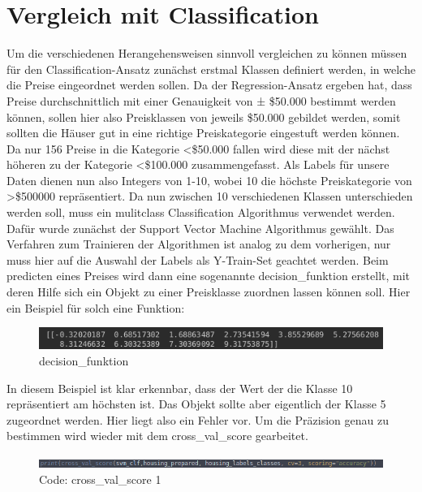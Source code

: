 \section{Vergleich mit Classification}
\label{vergleichMitClassification}
Um die verschiedenen Herangehensweisen sinnvoll vergleichen zu können müssen für den Classification-Ansatz zunächst erstmal Klassen definiert werden, in welche die Preise eingeordnet werden sollen. 
Da der Regression-Ansatz ergeben hat, dass Preise durchschnittlich mit einer Genauigkeit von ± \$50.000 bestimmt werden können, sollen hier also Preisklassen von jeweils \$50.000 gebildet werden, somit sollten die Häuser gut in eine richtige Preiskategorie eingestuft werden können. Da nur 156 Preise in die Kategorie <\$50.000 fallen wird diese mit der nächst höheren zu der Kategorie <\$100.000 zusammengefasst.
Als Labels für unsere Daten dienen nun also Integers von 1-10, wobei 10 die höchste Preiskategorie von >\$500000 repräsentiert.
Da nun zwischen 10 verschiedenen Klassen unterschieden werden soll, muss ein mulitclass Classification Algorithmus verwendet werden. Dafür wurde zunächst der Support Vector Machine Algorithmus gewählt. 
Das Verfahren zum Trainieren der Algorithmen ist analog zu dem vorherigen, nur muss hier auf die Auswahl der Labels als Y-Train-Set geachtet werden. 
Beim predicten eines Preises wird dann eine sogenannte decision\_funktion erstellt, mit deren Hilfe sich ein Objekt zu einer Preisklasse zuordnen lassen können soll.
Hier ein Beispiel für solch eine Funktion:
\newline
\begin{figure}
	\includegraphics[width=1.0\textwidth]{../Bilder/pasted image 0 (4).png}
	\caption{decision\_funktion}
\end{figure}
In diesem Beispiel ist klar erkennbar, dass der Wert der die Klasse 10 repräsentiert am höchsten ist. Das Objekt sollte aber eigentlich der Klasse 5 zugeordnet werden. 
Hier liegt also ein Fehler vor. Um die Präzision genau zu bestimmen wird wieder mit dem cross\_val\_score gearbeitet.
\newline
\begin{figure}
	\includegraphics[width=1.0\textwidth]{../Bilder/pasted image 0 (5).png}
	\caption{Code: cross\_val\_score 1}
\end{figure}
